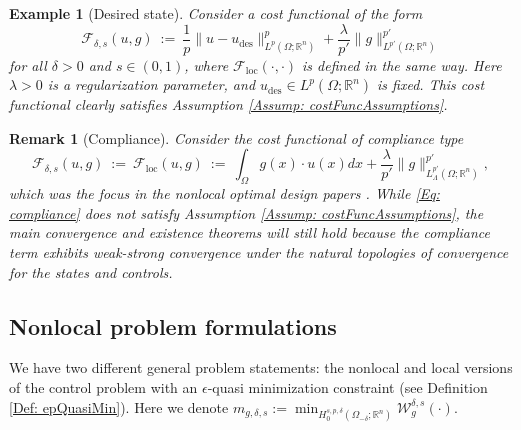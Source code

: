 \documentclass[11pt, reqno]{amsart}   	%
\theoremstyle{plain}
\numberwithin{equation}{section}
\newtheorem{example}[thm]{Example}
\newtheorem{remark}[thm]{Remark}
\def\de{\delta}
\def\ep{\epsilon}
\def\la{\lambda}
\def\La{\Lambda}
\def\Om{\Omega}
\def\R{\mathbb{R}}
\def\des{\text{des}}
\def\loc{\text{loc}}
\begin{document}
	\begin{example}[Desired state]\label{Ex: validCost}
    Consider a cost functional of the form
	\begin{equation}\label{Eq: costFuncSpec}
		\mathcal{F}_{\de, s}(u, g) \ := \ \frac{1}{p}\|u - u_{\des}\|^p_{L^p(\Om; \R^n)} + \frac{\la}{p'}\|g\|^{p'}_{L^{p'}(\Om; \R^n)}
	\end{equation}
    for all $\de > 0$ and $s \in (0, 1)$, where $\mathcal{F}_{\loc}(\cdot, \cdot)$ is defined in the same way. Here $\la > 0$ is a regularization parameter, and $u_{\des} \in L^p(\Om; \R^n)$ is fixed. This cost functional clearly satisfies Assumption \ref{Assump: costFuncAssumptions}.
	\end{example}

    \begin{remark}[Compliance]\label{Ex: Compliance}
    Consider the cost functional of compliance type 
    \begin{equation}\label{Eq: compliance}
    \mathcal{F}_{\de, s}(u, g) \ := \ \mathcal{F}_{\loc}(u, g) \ := \ \int_{\Om}g(x) \cdot u(x)dx + \frac{\la}{p'}\|g\|^{p'}_{L^{p'}_{\La}(\Om; \R^n)},
    \end{equation}
    which was the focus in the nonlocal optimal design papers \cite{andres2023minimization, mengesha2025design}. While \eqref{Eq: compliance} does not satisfy Assumption \ref{Assump: costFuncAssumptions}, the main convergence and existence theorems will still hold because the compliance term exhibits weak-strong convergence under the natural topologies of convergence for the states and controls.
    
    
\end{remark}

\subsection{Nonlocal problem formulations}\label{Subsec: setup}

We have two different general problem statements: the nonlocal and local versions of the control problem with an $\ep$-quasi minimization constraint (see Definition \ref{Def: epQuasiMin}). Here we denote $m_{g, \de, s} := \min_{H^{s, p, \de}_0(\Om_{-\de}; \R^n)}\mathcal{W}^{\de, s}_g(\cdot)$.
\end{document}
